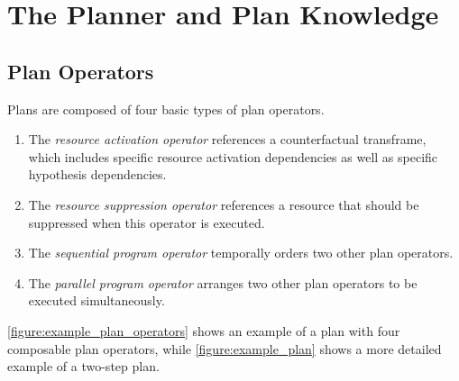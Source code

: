 \chapter{The Planner and Plan Knowledge}
\label{chapter:the_planner_and_plan_knowledge}



\section{Plan Operators}

Plans are composed of four basic types of plan operators.
\begin{enumerate}
\item The \emph{resource activation operator} references a
  counterfactual transframe, which includes specific resource
  activation dependencies as well as specific hypothesis dependencies.
\item The \emph{resource suppression operator} references a resource
  that should be suppressed when this operator is executed.
\item The \emph{sequential program operator} temporally orders two
  other plan operators.
\item The \emph{parallel program operator} arranges two other plan
  operators to be executed simultaneously.
\end{enumerate}
{\mbox{\autoref{figure:example_plan_operators}}} shows an example of a
plan with four composable plan operators, while
{\mbox{\autoref{figure:example_plan}}} shows a more detailed example
of a two-step plan.
